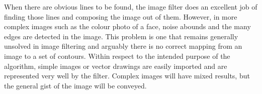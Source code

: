 When there are obvious lines to be found, the image filter does an excellent job of finding those lines and composing the image out of them. However, in more complex images such as the colour photo of a face, noise abounds and the many edges are detected in the image. This problem is one that remains generally unsolved in image filtering and arguably there is no correct mapping from an image to a set of contours. Within respect to the intended purpose of the algorithm, simple images or vector drawings are easily imported and are represented very well by the filter. Complex images will have mixed results, but the general gist of the image will be conveyed.
